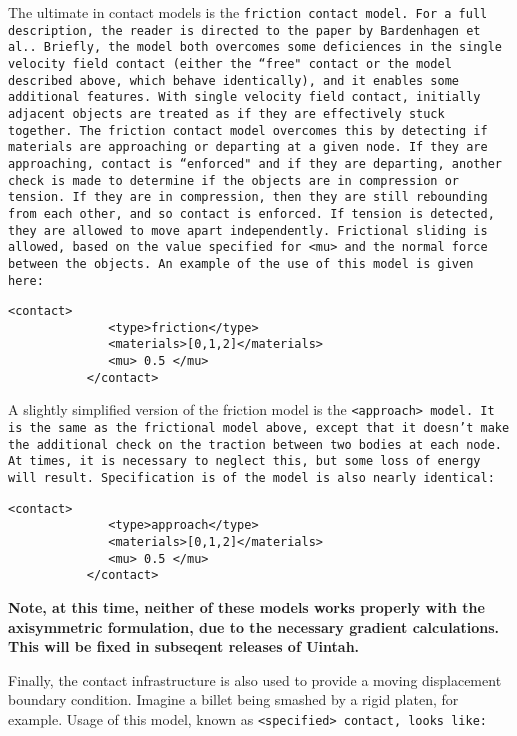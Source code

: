 The ultimate in contact models is the \tt friction \normalfont contact 
model.  For a full description, the reader is directed to the paper by
Bardenhagen et al.\cite{bard_contact}.  Briefly, the model both overcomes
some deficiences in the single velocity field contact (either the ``free"
contact or the model described above, which behave identically), and it
enables some additional features.  With single velocity field contact,
initially adjacent objects are treated as if they are effectively stuck
together.  The friction contact model overcomes this by detecting if
materials are approaching or departing at a given node.  If they are
approaching, contact is ``enforced" and if they are departing, another
check is made to determine if the objects are in compression or tension.
If they are in compression, then they are still rebounding from each other,
and so contact is enforced.  If tension is detected, they are allowed
to move apart independently.  Frictional sliding is allowed, based on
the value specified for \tt <mu> \normalfont and the normal force between
the objects.  An example of the use of this model is given here:

\begin{Verbatim}[fontsize=\footnotesize]
           <contact>
              <type>friction</type>
              <materials>[0,1,2]</materials>
              <mu> 0.5 </mu>
           </contact>
\end{Verbatim}

A slightly simplified version of the friction model is the
\tt <approach> \normalfont model.  It is the same as the frictional model
above, except that it doesn't make the additional check on the traction
between two bodies at each node.  At times, it is necessary to neglect this,
but some loss of energy will result.  Specification is of the model is 
also nearly identical:

\begin{Verbatim}[fontsize=\footnotesize]
           <contact>
              <type>approach</type>
              <materials>[0,1,2]</materials>
              <mu> 0.5 </mu>
           </contact>
\end{Verbatim}

{\bf Note, at this time, neither of these models works properly with 
the axisymmetric formulation, due to the necessary gradient calculations.
This will be fixed in subseqent releases of Uintah.}

Finally, the contact infrastructure is also used to provide a moving
displacement boundary condition.  Imagine a billet being smashed by a
rigid platen, for example.  Usage of this model, known as
\tt <specified> \normalfont contact, looks like:

